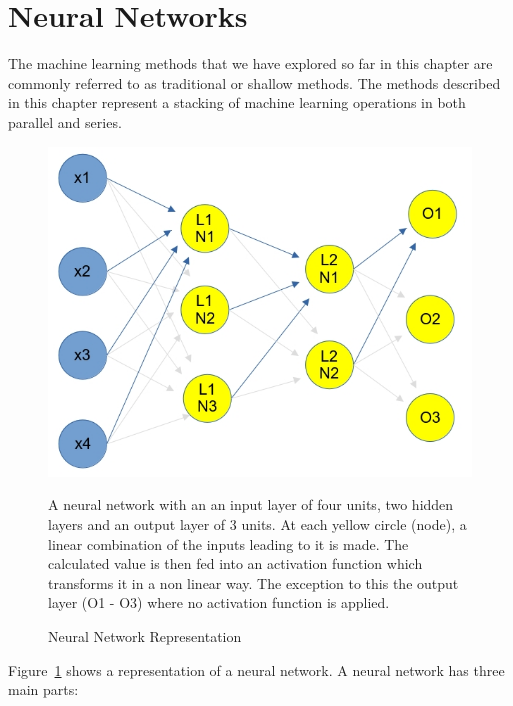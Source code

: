 \section{Neural Networks} \label{NN}

The machine learning methods that we have explored so far in this chapter are commonly referred to as traditional or shallow methods.  The methods described in this chapter represent a stacking of machine learning operations in both parallel and series.  

\begin{figure}[p]
	\centering
	\includegraphics[scale=0.65]{Figures/NeuralNetwork.jpg}
	\caption{Neural Network Representation} {A neural network with an an input layer of four units, two hidden layers and an output layer of 3 units. At each yellow circle (node), a linear combination of the inputs leading to it is made. The calculated value is then fed into an activation function which transforms it in a non linear way. The exception to this the output layer (O1 - O3) where no activation function is applied.}
	\label{fig:neural}
\end{figure}

\noindent
Figure~\ref{fig:neural} shows a representation of a neural network. A neural network has three main parts:


